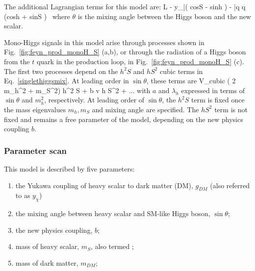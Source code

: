 The additional Lagrangian terms for this model are: 
\be \label{LintScalar2}
L \supset - y_\chi \bar\chi \chi (  cos\theta S - sin\theta h ) -  \bar q q (cos\theta h + sin\theta S )  \,
\ee
where $\theta$ is the mixing angle between the Higgs boson and the new scalar. 

Mono-Higgs signals in this model arise through processes shown in Fig.~\ref{fig:feyn_prod_monoH_S} (a,b), or through 
the radiation of a Higgs boson from the  $t$ quark in the production loop, in Fig.~\ref{fig:feyn_prod_monoH_S} (c). 
The first two processes depend on the $h^2 S$ and $h S^2$ cubic terms in Eq.~\eqref{singlethiggsmix}.  
At leading order in $\sin\theta$, these terms are
\be
V_{\rm cubic} \approx {} ( 2 m_h^2 + m_S^2) h^2 S  + b v h S^2 + ...
\ee
with $a$ and $\lambda_h$ expressed in terms of $\sin\theta$ and $m_h^2$, respectively.  
At leading order of $\sin\theta$, the $h^2 S$ term is fixed once the mass eigenvalues $m_h, m_S$ 
and mixing angle are specified.  The $h S^2$ term is not fixed and remains a free parameter of the model, depending on 
the new physics coupling $b$. 

\subsubsection{Parameter scan}

This model is described by five parameters: 

\begin{enumerate}
	\item the Yukawa coupling of heavy scalar to dark matter (DM), $g_{DM}$ (also referred to as $y_\chi$) 
	\item the mixing angle between heavy scalar and SM-like Higgs boson, $\sin\theta$;
	\item the new physics coupling, $b$;
	\item mass of heavy scalar, $m_{S}$, also termed \mmed;
	\item mass of dark matter, $m_{DM}$;
\end{enumerate}

